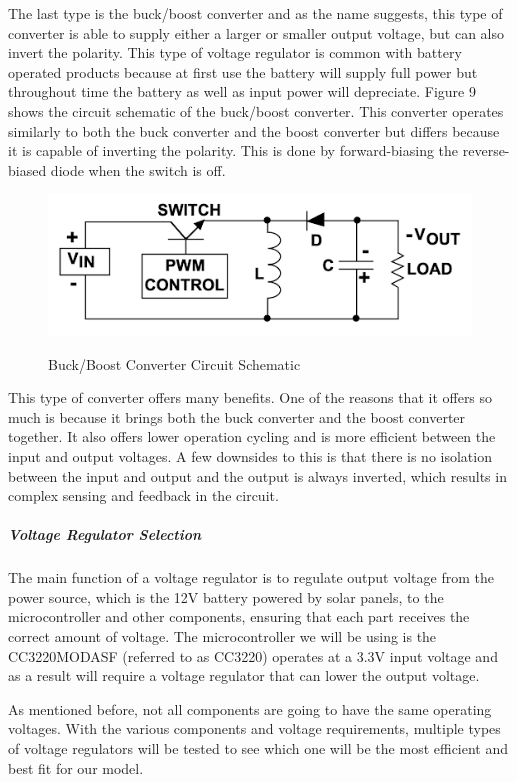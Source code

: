 The last type is the buck/boost converter and as the name suggests, this type of converter is able to supply either a larger or smaller output voltage, but can also invert the polarity. This type of voltage regulator is common with battery operated products because at first use the battery will supply full power but throughout time the battery as well as input power will depreciate. Figure 9 shows the circuit schematic of the buck/boost converter. This converter operates similarly to both the buck converter and the boost converter but differs because it is capable of inverting the polarity. This is done by forward-biasing the reverse-biased diode when the switch is off. \par
\begin{figure}[H]
    \caption{Buck/Boost Converter Circuit Schematic}
    \centering
    \includegraphics[width=\textwidth]{images/Buck_Boost_Converter.png}
    \label{fig:buck-boost-schematic}
\end{figure}
This type of converter offers many benefits. One of the reasons that it offers so much is because it brings both the buck converter and the boost converter together. It also offers lower operation cycling and is more efficient between the input and output voltages. A few downsides to this is that there is no isolation between the input and output and the output is always inverted, which results in complex sensing and feedback in the circuit. \par
\subparagraph{Voltage Regulator Selection}
The main function of a voltage regulator is to regulate output voltage from the power source, which is the 12V battery powered by solar panels, to the microcontroller and other components, ensuring that each part receives the correct amount of voltage. The microcontroller we will be using is the CC3220MODASF (referred to as CC3220) operates at a 3.3V input voltage and as a result will require a voltage regulator that can lower the output voltage. \par
As mentioned before, not all components are going to have the same operating voltages. With the various components and voltage requirements, multiple types of voltage regulators will be tested to see which one will be the most efficient and best fit for our model.\par
